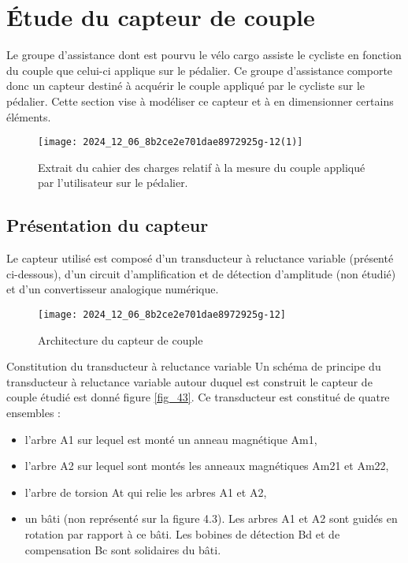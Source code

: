 
\section{Étude du capteur de couple \label{ATS_2024_sec4}}

Le groupe d'assistance dont est pourvu le vélo cargo assiste le cycliste en fonction du couple que celui-ci applique sur le pédalier. Ce groupe d'assistance comporte donc un capteur destiné à acquérir le couple appliqué par le cycliste sur le pédalier. Cette section vise à modéliser ce capteur et à en dimensionner certains éléments.\\

\begin{figure}[!htb]
\begin{center}
\texttt{[image: 2024\_12\_06\_8b2ce2e701dae8972925g-12(1)]}
\caption{Extrait du cahier des charges relatif à la mesure du couple appliqué par l'utilisateur sur le pédalier. \label{fig_41}}
\end{center}
\end{figure}

\subsection{Présentation du capteur}
Le capteur utilisé est composé d'un transducteur à reluctance variable (présenté ci-dessous), d'un circuit d'amplification et de détection d'amplitude (non étudié) et d'un convertisseur analogique numérique.

\begin{figure}[!htb]
\begin{center}
\texttt{[image: 2024\_12\_06\_8b2ce2e701dae8972925g-12]}
\caption{Architecture du capteur de couple \label{fig_42}}
\end{center}
\end{figure}

Constitution du transducteur à reluctance variable Un schéma de principe du transducteur à reluctance variable autour duquel est construit le capteur de couple étudié est donné figure \ref{fig_43}. Ce transducteur est constitué de quatre ensembles :

\begin{itemize}
  \item l'arbre A1 sur lequel est monté un anneau magnétique Am1,
  \item l'arbre A2 sur lequel sont montés les anneaux magnétiques Am21 et Am22,
  \item l'arbre de torsion At qui relie les arbres A1 et A2,
  \item un bâti (non représenté sur la figure 4.3). Les arbres A1 et A2 sont guidés en rotation par rapport à ce bâti. Les bobines de détection Bd et de compensation Bc sont solidaires du bâti.
\end{itemize}

